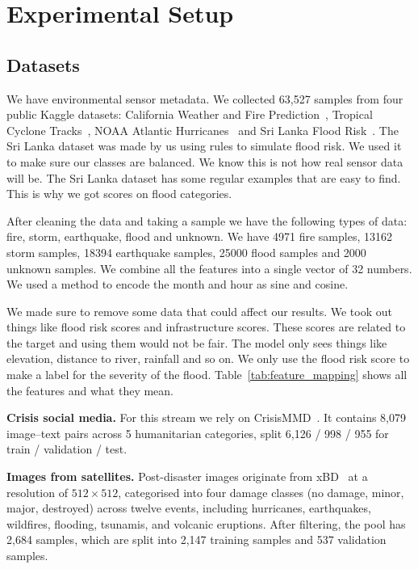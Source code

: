 \documentclass[journal]{IEEEtran}
\begin{document}
\section{Experimental Setup}

\subsection{Datasets}

We have environmental sensor metadata. We collected 63,527 samples from four public Kaggle datasets: California Weather and Fire Prediction~\cite{kaggle_fire}, Tropical Cyclone Tracks~\cite{kaggle_cyclone_tracks}, NOAA Atlantic Hurricanes~\cite{kaggle_storm_atl} and Sri Lanka Flood Risk~\cite{kaggle_srilanka_flood}. The Sri Lanka dataset was made by us using rules to simulate flood risk. We used it to make sure our classes are balanced. We know this is not how real sensor data will be. The Sri Lanka dataset has some regular examples that are easy to find. This is why we got scores on flood categories.
 
After cleaning the data and taking a sample we have the following types of data: fire, storm, earthquake, flood and unknown. We have 4971 fire samples, 13162 storm samples, 18394 earthquake samples, 25000 flood samples and 2000 unknown samples. We combine all the features into a single vector of 32 numbers. We used a method to encode the month and hour as sine and cosine.

We made sure to remove some data that could affect our results. We took out things like flood risk scores and infrastructure scores. These scores are related to the target and using them would not be fair. The model only sees things like elevation, distance to river, rainfall and so on. We only use the flood risk score to make a label for the severity of the flood. Table~\ref{tab:feature_mapping} shows all the features and what they mean.

\textbf{Crisis social media.} For this stream we rely on CrisisMMD~\cite{alam2018crisismmd}. It contains 8,079 image--text pairs across 5 humanitarian categories, split 6,126 / 998 / 955 for train / validation / test.

\textbf{Images from satellites.} Post-disaster images originate from xBD~\cite{gupta2019xbd} at a resolution of $512 \times 512$, categorised into four damage classes (no damage, minor, major, destroyed) across twelve events, including hurricanes, earthquakes, wildfires, flooding, tsunamis, and volcanic eruptions. After filtering, the pool has 2,684 samples, which are split into 2,147 training samples and 537 validation samples.
 
\end{document}
